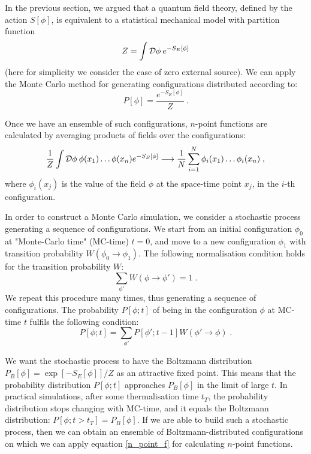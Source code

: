 In the previous section, we argued that a quantum field theory, defined by the action $
S[\phi]$, is equivalent to a statistical mechanical model with partition function
\begin{equation}
Z = \int \mathcal D \phi \: e^{- S_E[\phi]}
\end{equation}
%
(here for simplicity we consider the case of zero external source). We can apply the Monte Carlo method for generating configurations distributed according to:
\begin{equation}
P[\phi] = \frac{e^{-S_E[\phi]}}{Z} \: .
\label{Boltz_dist}
\end{equation}


Once we have an ensemble of such configurations, $n$-point functions are calculated by averaging products of fields over the configurations:
\begin{equation}
\frac{1}{Z} \int \mathcal D \phi \: \phi(x_1) \dots \phi(x_n) e^{ -S_E[\phi]} \longrightarrow \frac{1}{N}\sum_{i=1}^N \phi_i(x_1) \dots \phi_i(x_n) \; ,
\label{n_point_f}
\end{equation}
%
where $\phi_i(x_j)$ is the value of the field $\phi$ at the space-time point $x_j$, in the $i$-th configuration. 


In order to construct a Monte Carlo simulation, we consider a stochastic process generating a sequence of configurations.  We start from an initial configuration $\phi_0$ at "Monte-Carlo time" (MC-time) $t = 0$, and move to a new configuration $\phi_1$ with transition probability $W(\phi_0 \to \phi_1)$. The following normalisation condition holds for the transition probability $W$:
\begin{equation}
\sum_{\phi'} W(\phi \to \phi') = 1 \; .
\label{prob_norm}
\end{equation}
%
We repeat this procedure many times, thus generating a sequence of configurations. The probability $P[\phi; t]$ of being in the configuration $\phi$ at MC-time $t$ fulfils the following condition:
\begin{equation}
P[\phi; t] = \sum_{\phi'} P[\phi'; t-1] W(\phi' \to \phi) \; .
\label{prob_evolution}
\end{equation}

We want the stochastic process to have the Boltzmann distribution $P_B[\phi] = \exp[-S_E[\phi]]/Z$ as an attractive fixed point. This means that the probability distribution $P[\phi; t]$ approaches $P_B[\phi]$ in the limit of large $t$. In practical simulations, after some thermalisation time $t_T$, the probability distribution stops changing with MC-time, and it equals the Boltzmann distribution: $P[\phi; t>t_T] = P_B[\phi]$. If we are able to build such a stochastic process, then we can obtain an ensemble of Boltzmann-distributed configurations on which we can apply equation \ref{n_point_f} for calculating $n$-point functions.

